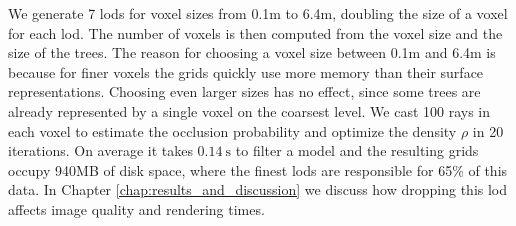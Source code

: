 We generate 7 \acsp{lod} for voxel sizes from 0.1m to 6.4m, doubling the size of a voxel for each \ac{lod}.
The number of voxels is then computed from the voxel size and the size of the trees.
The reason for choosing a voxel size between 0.1m and 6.4m is because for finer voxels the grids quickly use more memory than their surface representations.
Choosing even larger sizes has no effect, since some trees are already represented by a single voxel on the coarsest level.
We cast 100 rays in each voxel to estimate the occlusion probability and optimize the density $\rho$ in 20 iterations.
On average it takes $\SI{0.14}{\s}$ to filter a model and the resulting grids occupy 940MB of disk space, where the finest \acsp{lod} are responsible for 65\% of this data.
In Chapter \ref{chap:results_and_discussion} we discuss how dropping this \ac{lod} affects image quality and rendering times.

